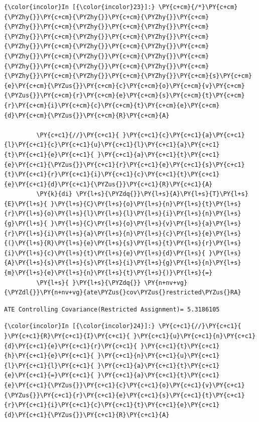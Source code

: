 \documentclass[11pt,notitlepage]{article}\usepackage[]{graphicx}\usepackage[]{color}
\makeatletter
\newenvironment{kframe}{%
 \def\at@end@of@kframe{}%
 \ifinner\ifhmode%
  \def\at@end@of@kframe{\end{minipage}}%
  \begin{minipage}{\columnwidth}%
 \fi\fi%
 \def\FrameCommand##1{\hskip\@totalleftmargin \hskip-\fboxsep
 \colorbox{shadecolor}{##1}\hskip-\fboxsep
     \hskip-\linewidth \hskip-\@totalleftmargin \hskip\columnwidth}%
 \MakeFramed {\advance\hsize-\width
   \@totalleftmargin\z@ \linewidth\hsize
   \@setminipage}}%
 {\par\unskip\endMakeFramed%
 \at@end@of@kframe}
\newenvironment{knitrout}{}{} %
\makeatother
\begin{document}
\begin{enumerate}[a)]
\begin{knitrout}
\begin{kframe}
    \begin{Verbatim}[commandchars=\\\{\}]
{\color{incolor}In [{\color{incolor}23}]:} \PY{c+cm}{/*}\PY{c+cm}{\PYZhy{}}\PY{c+cm}{\PYZhy{}}\PY{c+cm}{\PYZhy{}}\PY{c+cm}{\PYZhy{}}\PY{c+cm}{\PYZhy{}}\PY{c+cm}{\PYZhy{}}\PY{c+cm}{\PYZhy{}}\PY{c+cm}{\PYZhy{}}\PY{c+cm}{\PYZhy{}}\PY{c+cm}{\PYZhy{}}\PY{c+cm}{\PYZhy{}}\PY{c+cm}{\PYZhy{}}\PY{c+cm}{\PYZhy{}}\PY{c+cm}{\PYZhy{}}\PY{c+cm}{\PYZhy{}}\PY{c+cm}{\PYZhy{}}\PY{c+cm}{\PYZhy{}}\PY{c+cm}{\PYZhy{}}\PY{c+cm}{\PYZhy{}}\PY{c+cm}{\PYZhy{}}\PY{c+cm}{\PYZhy{}}\PY{c+cm}{s}\PY{c+cm}{e}\PY{c+cm}{\PYZus{}}\PY{c+cm}{c}\PY{c+cm}{o}\PY{c+cm}{v}\PY{c+cm}{\PYZus{}}\PY{c+cm}{r}\PY{c+cm}{e}\PY{c+cm}{s}\PY{c+cm}{t}\PY{c+cm}{r}\PY{c+cm}{i}\PY{c+cm}{c}\PY{c+cm}{t}\PY{c+cm}{e}\PY{c+cm}{d}\PY{c+cm}{\PYZus{}}\PY{c+cm}{R}\PY{c+cm}{A}
         
         \PY{c+c1}{//}\PY{c+c1}{ }\PY{c+c1}{c}\PY{c+c1}{a}\PY{c+c1}{l}\PY{c+c1}{c}\PY{c+c1}{u}\PY{c+c1}{l}\PY{c+c1}{a}\PY{c+c1}{t}\PY{c+c1}{e}\PY{c+c1}{ }\PY{c+c1}{a}\PY{c+c1}{t}\PY{c+c1}{e}\PY{c+c1}{\PYZus{}}\PY{c+c1}{r}\PY{c+c1}{e}\PY{c+c1}{s}\PY{c+c1}{t}\PY{c+c1}{r}\PY{c+c1}{i}\PY{c+c1}{c}\PY{c+c1}{t}\PY{c+c1}{e}\PY{c+c1}{d}\PY{c+c1}{\PYZus{}}\PY{c+c1}{R}\PY{c+c1}{A}
         \PY{k}{di} \PY{l+s}{\PYZdq{}}\PY{l+s}{A}\PY{l+s}{T}\PY{l+s}{E}\PY{l+s}{ }\PY{l+s}{C}\PY{l+s}{o}\PY{l+s}{n}\PY{l+s}{t}\PY{l+s}{r}\PY{l+s}{o}\PY{l+s}{l}\PY{l+s}{l}\PY{l+s}{i}\PY{l+s}{n}\PY{l+s}{g}\PY{l+s}{ }\PY{l+s}{C}\PY{l+s}{o}\PY{l+s}{v}\PY{l+s}{a}\PY{l+s}{r}\PY{l+s}{i}\PY{l+s}{a}\PY{l+s}{n}\PY{l+s}{c}\PY{l+s}{e}\PY{l+s}{(}\PY{l+s}{R}\PY{l+s}{e}\PY{l+s}{s}\PY{l+s}{t}\PY{l+s}{r}\PY{l+s}{i}\PY{l+s}{c}\PY{l+s}{t}\PY{l+s}{e}\PY{l+s}{d}\PY{l+s}{ }\PY{l+s}{A}\PY{l+s}{s}\PY{l+s}{s}\PY{l+s}{i}\PY{l+s}{g}\PY{l+s}{n}\PY{l+s}{m}\PY{l+s}{e}\PY{l+s}{n}\PY{l+s}{t}\PY{l+s}{)}\PY{l+s}{=}
         \PY{l+s}{ }\PY{l+s}{\PYZdq{}} \PY{n+nv+vg}{\PYZdl{}}\PY{n+nv+vg}{ate\PYZus{}cov\PYZus{}restricted\PYZus{}RA}
\end{Verbatim}

    \begin{Verbatim}[commandchars=\\\{\}]
ATE Controlling Covariance(Restricted Assignment)= 5.3186105
    \end{Verbatim}

    \begin{Verbatim}[commandchars=\\\{\}]
{\color{incolor}In [{\color{incolor}24}]:} \PY{c+c1}{//}\PY{c+c1}{ }\PY{c+c1}{R}\PY{c+c1}{I}\PY{c+c1}{ }\PY{c+c1}{u}\PY{c+c1}{n}\PY{c+c1}{d}\PY{c+c1}{e}\PY{c+c1}{r}\PY{c+c1}{ }\PY{c+c1}{t}\PY{c+c1}{h}\PY{c+c1}{e}\PY{c+c1}{ }\PY{c+c1}{n}\PY{c+c1}{u}\PY{c+c1}{l}\PY{c+c1}{l}\PY{c+c1}{ }\PY{c+c1}{a}\PY{c+c1}{t}\PY{c+c1}{e}\PY{c+c1}{=}\PY{c+c1}{ }\PY{c+c1}{a}\PY{c+c1}{t}\PY{c+c1}{e}\PY{c+c1}{\PYZus{}}\PY{c+c1}{c}\PY{c+c1}{o}\PY{c+c1}{v}\PY{c+c1}{\PYZus{}}\PY{c+c1}{r}\PY{c+c1}{e}\PY{c+c1}{s}\PY{c+c1}{t}\PY{c+c1}{r}\PY{c+c1}{i}\PY{c+c1}{c}\PY{c+c1}{t}\PY{c+c1}{e}\PY{c+c1}{d}\PY{c+c1}{\PYZus{}}\PY{c+c1}{R}\PY{c+c1}{A}
         

\end{Verbatim}
\end{kframe}
\end{knitrout}
\end{enumerate}
\end{document}
